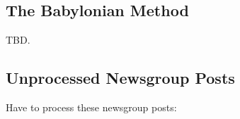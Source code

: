\subsection{The Babylonian Method}
\label{ctbg0:ssre0:sbab0}

TBD.


\subsection{Unprocessed Newsgroup Posts}
\label{ctbg0:ssre0:sunp0}

Have to process these newsgroup posts:

